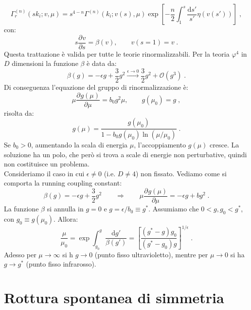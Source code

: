 \documentclass[12pt,a4paper]{article}
\theoremstyle{definition}
\newcommand{\pdev}[3][]{\frac{\partial^{#1} #2}{\partial #3^{#1}}}
\numberwithin{equation}{section}
\newcommand{\diff}[1][]{\mathrm{d}#1}
\begin{document}
\begin{equation}
\boxed{
\Gamma_r^{(n)}(sk_i;v,\mu)=s^{4-n}\Gamma^{(n)}(k_i;v(s),\mu)\exp\left[-\frac{n}{2}\int_1^s\frac{\diff{s'}}{s'}\eta(v(s'))\right]
}\;,
\end{equation}
con:
\begin{equation}
s\pdev{v}{s}=\beta(v),\qquad v(s=1)=v\;.
\end{equation}
Questa trattazione è valida per tutte le teorie rinormalizzabili. Per la teoria $\varphi^4$ in $D$ dimensioni la funzione $\beta$ è data da:
\begin{equation}
\beta(g)=-\epsilon g+\frac{3}{2}g^2\stackrel{\epsilon\to 0}{\longrightarrow} \frac{3}{2}g^2+\mathcal{O}(g^3)\;.
\end{equation}
Di conseguenza l'equazione del gruppo di rinormalizzazione è:
\begin{equation}
\mu \pdev{g(\mu)}{\mu}=b_0g^2{\mu},\qquad g(\mu_0)=g\;,
\end{equation}
risolta da:
\begin{equation}
\boxed{
g(\mu)=\frac{g(\mu_0)}{1-b_0g(\mu_0)\ln(\mu/\mu_0)}
}\;.
\end{equation}
Se $b_0>0$, aumentando la scala di energia $\mu$, l'accoppiamento $g(\mu)$ cresce. La soluzione ha un polo, che però si trova a scale di energie non perturbative, quindi non costituisce un problema. \\
Consideriamo il caso in cui $\epsilon\ne 0$ (i.e. $D\ne 4$) non fissato. Vediamo come si comporta la running coupling constant:
$$
\beta(g)=-\epsilon g+\frac{3}{2}g^2\qquad \Longrightarrow\qquad \mu\pdev{g(\mu)}{\mu}=-\epsilon g+bg^2\;.
$$
La funzione $\beta$ si annulla in $g=0$ e $g=\epsilon/b_0\equiv g^*$. Assumiamo che $0<g,g_0<g^*$, con $g_0\equiv g(\mu_0)$. Allora:
\begin{equation}
\frac{\mu}{\mu_0}=\exp\int_{g_0}^g\frac{\diff{g'}}{\beta(g')}=\left[\frac{(g^*-g)g_0}{(g^*-g_0)g}\right]^{1/\epsilon}\;.
\end{equation}
Adesso per $\mu\to\infty$ si h $g\to 0$ (punto fisso ultravioletto), mentre per $\mu\to 0$ si ha $g\to g^*$ (punto fisso infrarosso).
\cleardoublepage
\section{Rottura spontanea di simmetria}
\end{document}
